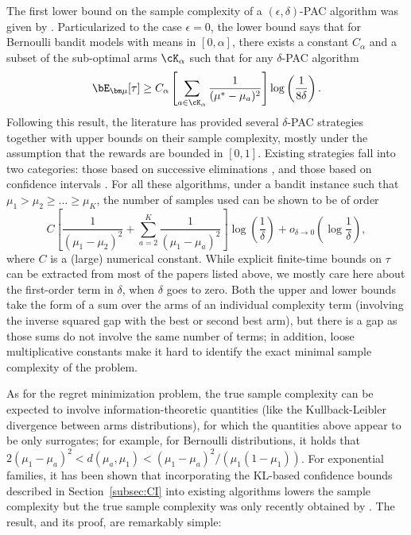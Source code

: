 \documentclass[proc]{edpsmath}
\begin{document}
	The first lower bound on the sample complexity of a $(\epsilon,\delta)$-PAC algorithm was given by \cite{MannorTsi04}.
	Particularized to the case $\epsilon=0$, the lower bound says that for Bernoulli bandit models with means in $[0,\alpha]$, there exists a constant $C_{\alpha}$ and a subset of the sub-optimal arms $\cK_\alpha$ such that for any $\delta$-PAC algorithm
	\[\bE_{\bm \mu}[\tau] \geq C_{\alpha}\left[ \sum_{a \in \cK_\alpha} \frac{1}{(\mu^* - \mu_a)^2}\right]\log \left(\frac{1}{8\delta}\right).\]
	Following this result, the literature has provided several $\delta$-PAC strategies together with upper bounds on their sample complexity, mostly under the assumption that the rewards are bounded in $[0,1]$. Existing strategies fall into two categories: those based on successive eliminations \cite{EvenDaral06,Karnin:al13}, and those based on confidence intervals \cite{Shivaramal12,Gabillon:al12,Jamiesonal14LILUCB}. 
	For all these algorithms, under a bandit instance such that $\mu_1 > \mu_2 \geq \dots \geq \mu_K$, the number of samples used can be shown to be of order
	\[C\left[\frac{1}{(\mu_1 - \mu_2)^2} + \sum_{a=2}^K\frac{1}{(\mu_1-\mu_a)^2}\right]\log\left(\frac{1}{\delta}\right) + o_{\delta \rightarrow 0}\left(\log \frac{1}{\delta}\right),\]
	where $C$ is a (large) numerical constant. While explicit finite-time bounds on $\tau$ can be extracted from most of the papers listed above, we mostly care here about the first-order term in $\delta$, when $\delta$ goes to zero. Both the upper and lower bounds take the form of a sum over the arms of an individual complexity term (involving the inverse squared gap with the best or second best arm), but there is a gap as those sums do not involve the same number of terms; in addition, loose  multiplicative constants make it hard to identify the exact minimal sample complexity of the problem.  
	
	As for the regret minimization problem, the true sample complexity can be expected to involve information-theoretic quantities (like the Kullback-Leibler divergence between arms distributions), for which the quantities above appear to be only surrogates; for example, for Bernoulli distributions, it holds that $2(\mu_1 - \mu_a)^2< d(\mu_a,\mu_1) < (\mu_1 - \mu_a)^2/(\mu_1(1-\mu_1))$. For exponential families, it has been shown that incorporating the KL-based confidence bounds described in Section~\ref{subsec:CI} into existing algorithms lowers the sample complexity \cite{COLT13} but the true sample complexity was only recently obtained by \cite{GK16}. The result, and its proof, are remarkably simple:
	
\end{document}
